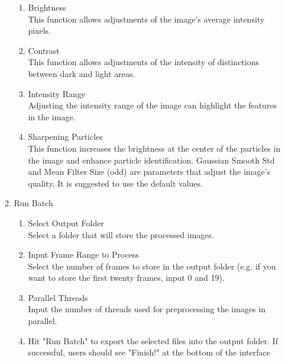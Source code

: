 \documentclass[a4paper,fleqn]{article}
\begin{document}
\begin{enumerate}
\begin{enumerate}
\begin{enumerate}
        \item Brightness\\
        This function allows adjustments of the image's average intensity pixels.
         
        \item Contrast\\
        This function allows adjustments of the intensity of distinctions between dark and light areas.

        \item Intensity Range\\
        Adjusting the intensity range of the image can highlight the features in the image. 

        \item Sharpening Particles\\
        This function increases the brightness at the center of the particles in the image and enhance particle identification. 
        Gaussian Smooth Std and Mean Filter Size (odd) are parameters that adjust the image's quality. It is suggested to use the default values. 

        \end{enumerate}
        
    \item Run Batch
    \begin{enumerate}
        \item Select Output Folder\\
        Select a folder that will store the processed images. 

        \item Input Frame Range to Process\\
        Select the number of frames to store in the output folder (e.g. if you want to store the first twenty frames, input 0 and 19). 

        \item Parallel Threads\\
        Input the number of threads used for preprocessing the images in parallel.

        \item Hit "Run Batch" to export the selected files into the output folder. If successful, users should see "Finish!" at the bottom of the interface
    \end{enumerate}
        
    \end{enumerate}
\end{enumerate}
\end{document}
